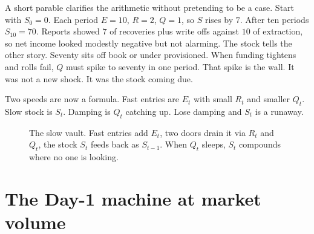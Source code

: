 A short parable clarifies the arithmetic without pretending to be a case. Start with $S_0 = 0$. Each period $E = 10$, $R = 2$, $Q = 1$, so $S$ rises by $7$. After ten periods $S_{10} = 70$. Reports showed $7$ of recoveries plus write offs against $10$ of extraction, so net income looked modestly negative but not alarming. The stock tells the other story. Seventy sits off book or under provisioned. When funding tightens and rolls fail, $Q$ must spike to seventy in one period. That spike is the wall. It was not a new shock. It was the stock coming due.

Two speeds are now a formula. Fast entries are $E_t$ with small $R_t$ and smaller $Q_t$. Slow stock is $S_t$. Damping is $Q_t$ catching up. Lose damping and $S_t$ is a runaway.

\begin{figure}[h]
\centering
{}
\caption{The slow vault. Fast entries add $E_t$, two doors drain it via $R_t$ and $Q_t$, the stock $S_t$ feeds back as $S_{t-1}$. When $Q_t$ sleeps, $S_t$ compounds where no one is looking.}
\label{fig:timeline-vault}
\end{figure}

\section{The Day-1 machine at market volume}

